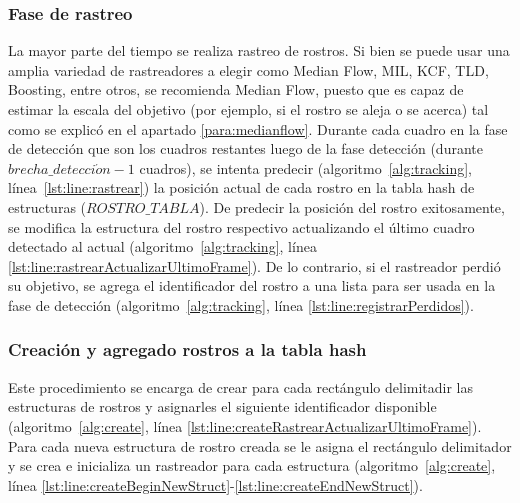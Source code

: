 \documentclass[a4paper,openright,12pt]{report}
\begin{document}
\subsubsection{Fase de rastreo}
La mayor parte del tiempo se realiza rastreo de rostros. Si bien se puede usar
una amplia variedad de rastreadores a elegir como Median Flow, MIL, KCF, TLD,
Boosting, entre otros, se recomienda Median Flow, puesto que es capaz de
estimar la escala del objetivo (por ejemplo, si el rostro se aleja o se acerca)
tal como se explicó en el apartado \ref{para:medianflow}.
Durante cada cuadro en la fase de detección que son los cuadros restantes
luego de la fase detección (durante $brecha\_detecci\acute on - 1$ cuadros), se
intenta predecir (algoritmo~\ref{alg:tracking}, línea~\ref{lst:line:rastrear})
la posición actual de cada rostro en la tabla hash de estructuras
($ROSTRO\_TABLA$). De predecir la posición del rostro exitosamente, se modifica
la estructura del rostro respectivo actualizando el último cuadro detectado al
actual (algoritmo~\ref{alg:tracking},
línea \ref{lst:line:rastrearActualizarUltimoFrame}). De lo contrario,
si el rastreador perdió su objetivo, se agrega el identificador del rostro a una
lista para ser usada en la fase de detección (algoritmo~\ref{alg:tracking},
línea \ref{lst:line:registrarPerdidos}).\\


\subsubsection{Creación y agregado rostros a la tabla hash} \label{sssec:create}
Este procedimiento se encarga de crear para cada rectángulo delimitadir las
estructuras de rostros y asignarles el siguiente identificador disponible
(algoritmo~\ref{alg:create},
línea \ref{lst:line:createRastrearActualizarUltimoFrame}). Para cada nueva
estructura de rostro creada se le asigna el rectángulo delimitador y se crea e
inicializa un rastreador para cada estructura (algoritmo~\ref{alg:create},
línea \ref{lst:line:createBeginNewStruct}-\ref{lst:line:createEndNewStruct}).\\
\end{document}
